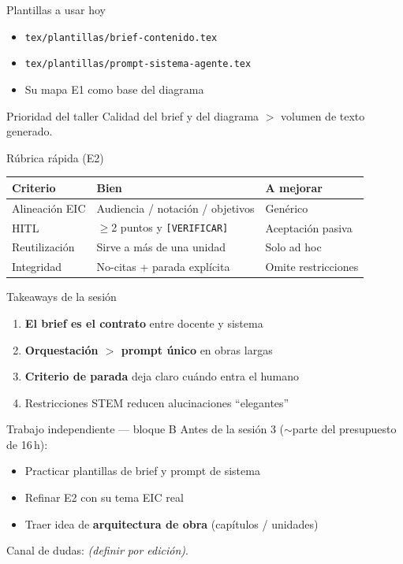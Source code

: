 \documentclass[aspectratio=169,11pt]{beamer}
\begin{document}
\begin{frame}{Plantillas a usar hoy}
\begin{itemize}
\item \texttt{tex/plantillas/brief-contenido.tex}
\item \texttt{tex/plantillas/prompt-sistema-agente.tex}
\item Su mapa E1 como base del diagrama
\end{itemize}
\begin{block}{Prioridad del taller}
Calidad del brief y del diagrama $>$ volumen de texto generado.
\end{block}
\end{frame}

\begin{frame}{Rúbrica rápida (E2)}
\begin{tabularx}{\textwidth}{@{}lXX@{}}
\toprule
Criterio & Bien & A mejorar \\
\midrule
Alineación EIC & Audiencia / notación / objetivos & Genérico \\
HITL & $\geq$2 puntos y \texttt{[VERIFICAR]} & Aceptación pasiva \\
Reutilización & Sirve a más de una unidad & Solo ad hoc \\
Integridad & No-citas + parada explícita & Omite restricciones \\
\bottomrule
\end{tabularx}
\end{frame}

\begin{frame}{Takeaways de la sesión}
\begin{enumerate}
\item \textbf{El brief es el contrato} entre docente y sistema
\item \textbf{Orquestación $>$ prompt único} en obras largas
\item \textbf{Criterio de parada} deja claro cuándo entra el humano
\item Restricciones STEM reducen alucinaciones ``elegantes''
\end{enumerate}
\end{frame}

\begin{frame}{Trabajo independiente --- bloque B}
Antes de la sesión 3 ($\sim$parte del presupuesto de 16\,h):
\begin{itemize}
\item Practicar plantillas de brief y prompt de sistema
\item Refinar E2 con su tema EIC real
\item Traer idea de \textbf{arquitectura de obra} (capítulos / unidades)
\end{itemize}
Canal de dudas: \emph{(definir por edición)}.
\end{frame}
\end{document}

